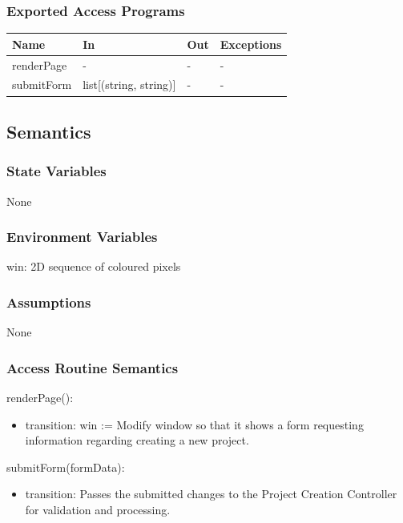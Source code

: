 \documentclass[12pt, titlepage]{article}
\begin{document}
\subsubsection{Exported Access Programs}

\begin{center}
\begin{tabular}{p{2cm} p{4cm} p{4cm} p{2cm}}
\hline
\textbf{Name} & \textbf{In} & \textbf{Out} & \textbf{Exceptions} \\
\hline
renderPage & - & - & - \\
submitForm & list[(string, string)] & - & - \\
\hline
\end{tabular}
\end{center}

\subsection{Semantics}

\subsubsection{State Variables}
None
\subsubsection{Environment Variables}
win: 2D sequence of coloured pixels

\subsubsection{Assumptions}
None

\subsubsection{Access Routine Semantics}

\noindent renderPage():
\begin{itemize}
\item transition: win := Modify window so that it shows a form requesting information regarding creating a new project.
\end{itemize}

\noindent submitForm(formData):
\begin{itemize}
\item transition: Passes the submitted changes to the Project Creation Controller for validation and processing.
\end{itemize}
\end{document}
